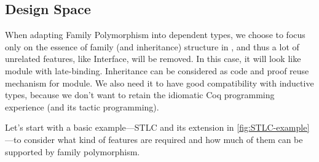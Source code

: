 \subsection{Design Space}

When adapting Family Polymorphism into dependent types, we choose to
focus only on the essence of family (and inheritance)
structure in \citet{zm2017}, and thus a lot of unrelated features, like
Interface, will be removed. In this case, it will look like module with
late-binding. Inheritance can be considered as code and proof reuse mechanism for module. We also
need it to have good compatibility with inductive types, because we
don't want to retain the idiomatic Coq programming experience
(and its tactic programming). 

Let's start with a basic example---STLC and its extension in
\cref{fig:STLC-example}---to consider what kind of features are required
and how much of them can be supported by family polymorphism.

